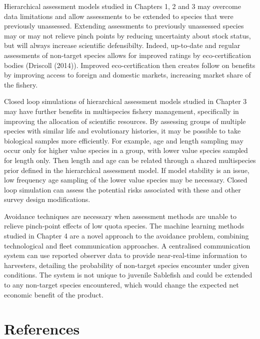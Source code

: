 \documentclass[12pt,]{scrartcl}
\begin{document}
Hierarchical assessment models studied in Chapters 1, 2 and 3 may
overcome data limitations and allow assessments to be extended to
species that were previously unassessed. Extending assessments to
previously unassessed species may or may not relieve pinch points by
reducing uncertainty about stock status, but will always increase
scientific defensibilty. Indeed, up-to-date and regular assessments of
non-target species allows for improved ratings by eco-certification
bodies (Driscoll (2014)). Improved eco-certification then creates follow
on benefits by improving access to foreign and domestic markets,
increasing market share of the fishery.

Closed loop simulations of hierarchical assessment models studied in
Chapter 3 may have further benefits in multispecies fishery management,
specifically in improving the allocation of scientific resources. By
assessing groups of multiple species with similar life and evolutionary
histories, it may be possible to take biological samples more
efficiently. For example, age and length sampling may occur only for
higher value species in a group, with lower value species sampled for
length only. Then length and age can be related through a shared
multispecies prior defined in the hierarchical assessment model. If
model stability is an issue, low frequency age sampling of the lower
value species may be necessary. Closed loop simulation can assess the
potential risks associated with these and other survey design
modifications.

Avoidance techniques are necessary when assessment methods are unable to
relieve pinch-point effects of low quota species. The machine learning
methods studied in Chapter 4 are a novel approach to the avoidance
problem, combining technological and fleet communication approaches. A
centralised communication system can use reported observer data to
provide near-real-time information to harvesters, detailing the
probability of non-target species encounter under given conditions. The
system is not unique to juvenile Sablefish and could be extended to any
non-target species encountered, which would change the expected net
economic benefit of the product.

\section*{References}
\setlength{\parindent}{-0.2in}
\singlespacing
\small
\setlength{\leftskip}{0.2in}
\setlength{\parskip}{8pt}
\vspace*{-0.4in}
\noindent
\end{document}
